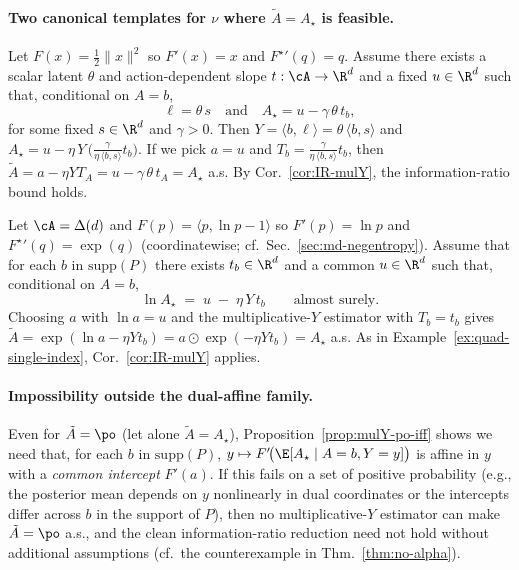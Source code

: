\paragraph{Two canonical templates for $\nu$ where $\tilde{A}=A_\star$ is feasible.}

\begin{example}\label{ex:quad-single-index}
    Let $F(x)=\tfrac12\|x\|^2$ so $F'(x)=x$ and ${F^\star}'(q)=q$.
    Assume there exists a scalar latent $\theta$ and action-dependent slope $t:\cA\to\R^d$
    and a fixed $u\in\R^d$ such that, conditional on $A=b$,
    \[
        \ell = \theta\,s \quad\text{and}\quad
        A_\star = u - \gamma\,\theta\,t_b,
    \]
    for some fixed $s\in\R^d$ and $\gamma>0$.
    Then $Y=\langle b,\ell\rangle=\theta\,\langle b,s\rangle$ and
    \(
    A_\star = u - \eta\,Y\,\Big(\frac{\gamma}{\eta\,\langle b,s\rangle}t_b\Big).
    \)
    If we pick $a=u$ and $T_b=\frac{\gamma}{\eta\,\langle b,s\rangle}t_b$, then
    \(
    \tilde{A}=a-\eta Y T_A = u-\gamma\,\theta\,t_A=A_\star
    \)
    a.s.  By Cor.~\ref{cor:IR-mulY}, the information-ratio bound holds.
\end{example}

\begin{example}\label{ex:negentropy-loglinear}
    Let $\cA=\Delta(d)$ and $F(p)=\langle p,\ln p -1\rangle$ so $F'(p)=\ln p$ and
    ${F^\star}'(q)=\exp(q)$ (coordinatewise; cf.\ Sec.~\ref{sec:md-negentropy}).
    Assume that for each $b$ in $\mathrm{supp}(P)$ there exists $t_b\in\R^d$ and a common
    $u\in\R^d$ such that, conditional on $A=b$,
    \[
        \ln A_\star \;=\; u \;-\;\eta\,Y\,t_b \qquad\text{almost surely.}
    \]
    Choosing $a$ with $\ln a=u$ and the multiplicative-$Y$ estimator with $T_b=t_b$ gives
    \(
    \tilde{A}=\exp(\ln a - \eta Y t_b)=a\odot \exp(-\eta Y t_b)=A_\star
    \)
    a.s.  As in Example~\ref{ex:quad-single-index}, Cor.~\ref{cor:IR-mulY} applies.
\end{example}

\paragraph{Impossibility outside the dual-affine family.}
Even for $\tilde{A}=\po$ (let alone $\tilde{A}=A_\star$), Proposition~\ref{prop:mulY-po-iff}
shows we need that, for each $b$ in $\mathrm{supp}(P)$,
$y\mapsto F'\!\big(\E[A_\star\mid A=b,Y=y]\big)$ is affine in $y$ with a \emph{common intercept}
$F'(a)$. If this fails on a set of positive probability (e.g., the posterior mean depends on $y$
nonlinearly in dual coordinates or the intercepts differ across $b$ in the support of $P$),
then no multiplicative-$Y$ estimator can make $\tilde{A}=\po$ a.s., and the clean
information-ratio reduction need not hold without additional assumptions
(cf.\ the counterexample in Thm.~\ref{thm:no-alpha}).

